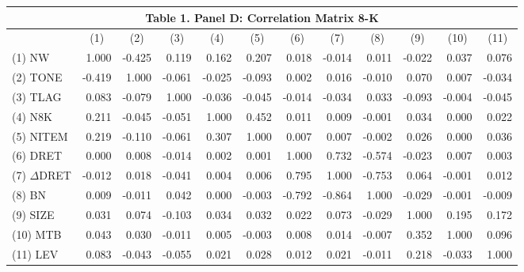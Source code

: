 \begin{table}[H] \label{T1PD}
  \centering
    \begin{tabular}{lrrrrrrrrrrr}
    \multicolumn{12}{c}{\textbf{Table 1. Panel D: Correlation Matrix 8-K}} \\
    \midrule
      & \multicolumn{1}{c}{(1)} & \multicolumn{1}{c}{(2)} & \multicolumn{1}{c}{(3)} & \multicolumn{1}{c}{(4)} & \multicolumn{1}{c}{(5)} & \multicolumn{1}{c}{(6)} & \multicolumn{1}{c}{(7)} & \multicolumn{1}{c}{(8)} & \multicolumn{1}{c}{(9)} & \multicolumn{1}{c}{(10)} & \multicolumn{1}{c}{(11)} \\
    \midrule
    (1) NW & 1.000 & -0.425 & 0.119 & 0.162 & 0.207 & 0.018 & -0.014 & 0.011 & -0.022 & 0.037 & 0.076 \\
    (2) TONE & -0.419 & 1.000 & -0.061 & -0.025 & -0.093 & 0.002 & 0.016 & -0.010 & 0.070 & 0.007 & -0.034 \\
    (3) TLAG & 0.083 & -0.079 & 1.000 & -0.036 & -0.045 & -0.014 & -0.034 & 0.033 & -0.093 & -0.004 & -0.045 \\
    (4) N8K & 0.211 & -0.045 & -0.051 & 1.000 & 0.452 & 0.011 & 0.009 & -0.001 & 0.034 & 0.000 & 0.022 \\
    (5) NITEM & 0.219 & -0.110 & -0.061 & 0.307 & 1.000 & 0.007 & 0.007 & -0.002 & 0.026 & 0.000 & 0.036 \\
    (6) DRET & 0.000 & 0.008 & -0.014 & 0.002 & 0.001 & 1.000 & 0.732 & -0.574 & -0.023 & 0.007 & 0.003 \\
    (7) $\Delta$DRET & -0.012 & 0.018 & -0.041 & 0.004 & 0.006 & 0.795 & 1.000 & -0.753 & 0.064 & -0.001 & 0.012 \\
    (8) BN & 0.009 & -0.011 & 0.042 & 0.000 & -0.003 & -0.792 & -0.864 & 1.000 & -0.029 & -0.001 & -0.009 \\
    (9) SIZE & 0.031 & 0.074 & -0.103 & 0.034 & 0.032 & 0.022 & 0.073 & -0.029 & 1.000 & 0.195 & 0.172 \\
    (10) MTB & 0.043 & 0.030 & -0.011 & 0.005 & -0.003 & 0.008 & 0.014 & -0.007 & 0.352 & 1.000 & 0.096 \\
    (11) LEV & 0.083 & -0.043 & -0.055 & 0.021 & 0.028 & 0.012 & 0.021 & -0.011 & 0.218 & -0.033 & 1.000 \\
    \bottomrule
    \end{tabular}%
  \label{tab:addlabel}%
\end{table}%
